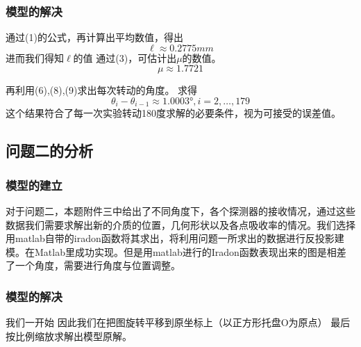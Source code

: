 \documentclass[withoutpreface,bwprint]{cumcmthesis} %
\begin{document}
\subsubsection {模型的解决}
通过(1)的公式，再计算出平均数值，得出
$$\ell \approx 0.2775  mm$$
进而我们得知$\ell$的值
通过(3)，可估计出$\mu$的数值。
\begin{displaymath}
\mu \approx 1.7721
\end{displaymath}

再利用(6),(8),(9)求出每次转动的角度。
求得
\begin{displaymath}
\theta_i-\theta_{i-1} \approx 1.0003°,i=2,\dots,179
\end{displaymath}
这个结果符合了每一次实验转动180度求解的必要条件，视为可接受的误差值。

\subsection{问题二的分析}
\subsubsection {模型的建立}
对于问题二，本题附件三中给出了不同角度下，各个探测器的接收情况，通过这些数据我们需要求解出新的介质的位置，几何形状以及各点吸收率的情况。我们选择用matlab自带的iradon函数将其求出，将利用问题一所求出的数据进行反投影建模。在Matlab里成功实现。但是用matlab进行的Iradon函数表现出来的图是相差了一个角度，需要进行角度与位置调整。
\subsubsection {模型的解决}
我们一开始
因此我们在把图旋转平移到原坐标上（以正方形托盘O为原点）
最后按比例缩放求解出模型原解。
\end{document}
